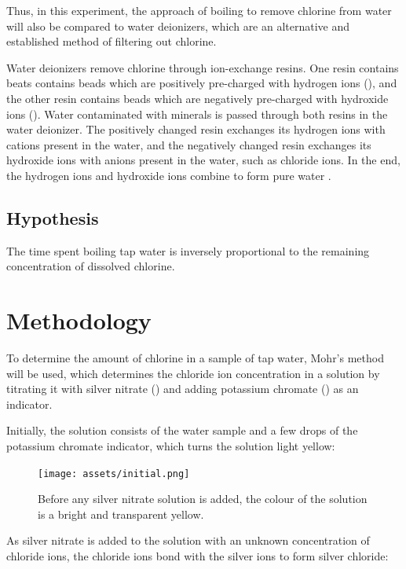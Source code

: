 \documentclass[11pt]{article}
\begin{document}
Thus, in this experiment, the approach of boiling to remove chlorine from water will also be compared to water deionizers, which are an alternative and established method of filtering out chlorine.

Water deionizers remove chlorine through ion-exchange resins. One resin contains beats contains beads which are positively pre-charged with hydrogen ions (), and the other resin contains beads which are negatively pre-charged with hydroxide ions (). Water contaminated with minerals is passed through both resins in the water deionizer. The positively changed resin exchanges its hydrogen ions with cations present in the water, and the negatively changed resin exchanges its hydroxide ions with anions present in the water, such as chloride ions. In the end, the hydrogen ions and hydroxide ions combine to form pure water .


\subsection{Hypothesis}
The time spent boiling tap water is inversely proportional to the remaining concentration of dissolved chlorine.

\newpage

\section{Methodology}

To determine the amount of chlorine in a sample of tap water, Mohr's method will be used, which determines the chloride ion concentration in a solution by titrating it with silver nitrate () and adding potassium chromate () as an indicator.

Initially, the solution consists of the water sample and a few drops of the potassium chromate indicator, which turns the solution light yellow:

\begin{figure}[H]
	\centering
	\texttt{[image: assets/initial.png]}
	\caption{Before any silver nitrate solution is added, the colour of the solution is a bright and transparent yellow.}
\end{figure}

As silver nitrate is added to the solution with an unknown concentration of chloride ions, the chloride ions bond with the silver ions to form silver chloride:
\end{document}
